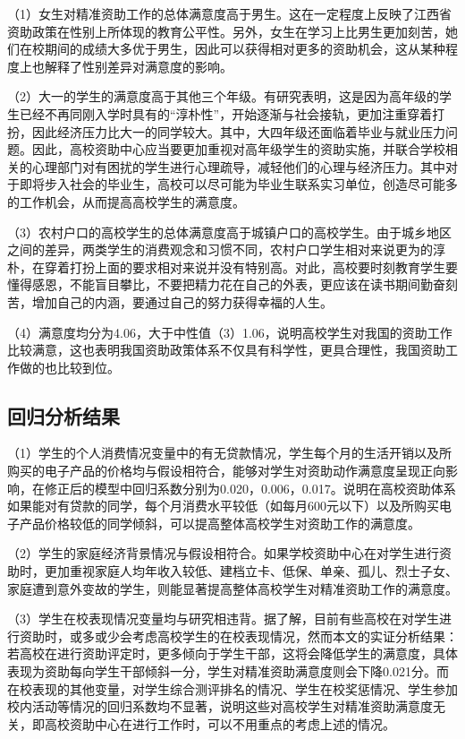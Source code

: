\documentclass[UTF8,a4paper,12pt]{ctexart}  %
\begin{document}
（1）女生对精准资助工作的总体满意度高于男生。这在一定程度上反映了江西省资助政策在性别上所体现的教育公平性。另外，女生在学习上比男生更加刻苦，她们在校期间的成绩大多优于男生，因此可以获得相对更多的资助机会，这从某种程度上也解释了性别差异对满意度的影响。

（2）大一的学生的满意度高于其他三个年级。有研究表明，这是因为高年级的学生已经不再同刚入学时具有的``淳朴性''，开始逐渐与社会接轨，更加注重穿着打扮，因此经济压力比大一的同学较大。其中，大四年级还面临着毕业与就业压力问题。因此，高校资助中心应当要更加重视对高年级学生的资助实施，并联合学校相关的心理部门对有困扰的学生进行心理疏导，减轻他们的心理与经济压力。其中对于即将步入社会的毕业生，高校可以尽可能为毕业生联系实习单位，创造尽可能多的工作机会，从而提高高校学生的满意度。

（3）农村户口的高校学生的总体满意度高于城镇户口的高校学生。由于城乡地区之间的差异，两类学生的消费观念和习惯不同，农村户口学生相对来说更为的淳朴，在穿着打扮上面的要求相对来说并没有特别高。对此，高校要时刻教育学生要懂得感恩，不能盲目攀比，不要把精力花在自己的外表，更应该在读书期间勤奋刻苦，增加自己的内涵，要通过自己的努力获得幸福的人生。

（4）满意度均分为4.06，大于中性值（3）1.06，说明高校学生对我国的资助工作比较满意，这也表明我国资助政策体系不仅具有科学性，更具合理性，我国资助工作做的也比较到位。

\hypertarget{section-33}{%
\subsection{回归分析结果}\label{section-33}}

（1）学生的个人消费情况变量中的有无贷款情况，学生每个月的生活开销以及所购买的电子产品的价格均与假设相符合，能够对学生对资助动作满意度呈现正向影响，在修正后的模型中回归系数分别为0.020，0.006，0.017。说明在高校资助体系如果能对有贷款的同学，每个月消费水平较低（如每月600元以下）以及所购买电子产品价格较低的同学倾斜，可以提高整体高校学生对资助工作的满意度。

（2）学生的家庭经济背景情况与假设相符合。如果学校资助中心在对学生进行资助时，更加重视家庭人均年收入较低、建档立卡、低保、单亲、孤儿、烈士子女、家庭遭到意外变故的学生，则能显著提高整体高校学生对精准资助工作的满意度。

（3）学生在校表现情况变量均与研究相违背。据了解，目前有些高校在对学生进行资助时，或多或少会考虑高校学生的在校表现情况，然而本文的实证分析结果：若高校在进行资助评定时，更多倾向于学生干部，这将会降低学生的满意度，具体表现为资助每向学生干部倾斜一分，学生对精准资助满意度则会下降0.021分。而在校表现的其他变量，对学生综合测评排名的情况、学生在校奖惩情况、学生参加校内活动等情况的回归系数均不显著，说明这些对高校学生对精准资助满意度无关，即高校资助中心在进行工作时，可以不用重点的考虑上述的情况。
\end{document}
